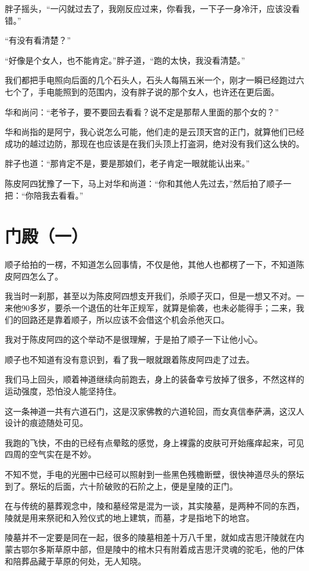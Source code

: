 胖子摇头，“一闪就过去了，我刚反应过来，你看我，一下子一身冷汗，应该没看错。”

“有没有看清楚？”

“好像是个女人，也不能肯定。”胖子道，“跑的太快，我没看清楚。”

我们都把手电照向后面的几个石头人，石头人每隔五米一个，刚才一瞬已经跑过六七个了，手电能照到的范围内，没有胖子说的那个女人，也许还在更后面。

华和尚问：“老爷子，要不要回去看看？说不定是那帮人里面的那个女的？”

华和尚指的是阿宁，我心说怎么可能，他们走的是云顶天宫的正门，就算他们已经成功的越过边防，那现在也应该是在我们头顶上打盗洞，绝对没有我们这么快的。

胖子也道：“那肯定不是，要是那娘们，老子肯定一眼就能认出来。”

陈皮阿四犹豫了一下，马上对华和尚道：“你和其他人先过去，”然后拍了顺子一把：“你陪我去看看。”

\chapter{门殿（一）}

顺子给拍的一楞，不知道怎么回事情，不仅是他，其他人也都楞了一下，不知道陈皮阿四怎么了。

我当时一刹那，甚至以为陈皮阿四想支开我们，杀顺子灭口，但是一想又不对。一来他90多岁，要杀一个退伍的壮年正规军，就算是偷袭，也未必能得手；二来，我们的回路还是靠着顺子，所以应该不会借这个机会杀他灭口。

我对于陈皮阿四的这个举动不是很理解，于是拍了顺子一下让他小心。

顺子也不知道有没有意识到，看了我一眼就跟着陈皮阿四走了过去。

我们马上回头，顺着神道继续向前跑去，身上的装备幸亏放掉了很多，不然这样的运动强度，恐怕没人能坚持住。

这一条神道一共有六道石门，这是汉家佛教的六道轮回，而女真信奉萨满，这汉人设计的痕迹随处可见。

我跑的飞快，不由的已经有点晕眩的感觉，身上裸露的皮肤可开始瘙痒起来，可见四周的空气实在是不妙。

不知不觉，手电的光圈中已经可以照射到一些黑色残檐断壁，很快神道尽头的祭坛到了。祭坛的后面，六十阶破败的石阶之上，便是皇陵的正门。

在与传统的墓葬观念中，陵和墓经常是混为一谈，其实陵墓，是两种不同的东西，陵就是用来祭祀和入殓仪式的地上建筑，而墓，才是指地下的地宫。

陵墓并不一定要是同在一起，很多的陵墓相差十万八千里，就如成吉思汗陵就在内蒙古鄂尔多斯草原中部，但是陵中的棺木只有附着成吉思汗灵魂的驼毛，他的尸体和陪葬品藏于草原的何处，无人知晓。

